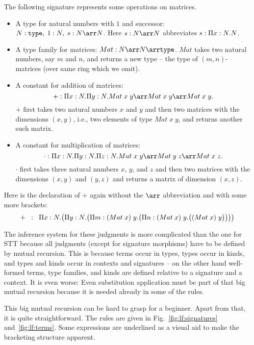 \begin{example}
The following signature represents some operations on matrices.
\begin{itemize}
	\item A type for natural numbers with $1$ and successor: $N:\TYPE,\;1:N,\;s:N\arr N$. Here $s:N\arr N$ abbreviates $s:\P{x}{N}N$.
	\item A type family for matrices: $Mat:N\arr N\arr\TYPE$. $Mat$ takes two natural numbers, say $m$ and $n$, and returns a new type -- the type of $(m,n)$-matrices (over same ring which we omit).
	\item A constant for addition of matrices:
	 \[+:\P{x}{N}\P{y}{N}Mat\;x\;y\arr Mat\;x\;y\arr Mat\;x\;y.\]
	 $+$ first takes two natural numbers $x$ and $y$ and then two matrices with the dimensions $(x,y)$, i.e., two elements of type $Mat\;x\;y$, and returns another such matrix.
	\item A constant for multiplication of matrices: 
	\[\cdot:\P{x}{N}\P{y}{N}\P{z}{N}Mat\;x\;y\arr Mat\;y\;z\arr Mat\;x\;z.\]
	 $\cdot$ first takes three natural numbers $x$, $y$, and $z$ and then two matrices with the dimensions $(x,y)$ and $(y,z)$ and returns a matrix of dimension $(x,z)$.
\end{itemize}
Here is the declaration of $+$ again without the $\arr$ abbreviation and with some more brackets:
\[+\;\;:\;\;\P{x}{N}\big(\P{y}{N}\big(\P{m}{(Mat\;x)\;y}\big(\P{n}{(Mat\;x)\;y}\big((Mat\;x)\;y\big)\big)\big)\big)\]
\end{example}

The inference system for these judgments is more complicated than the one for STT because all judgments (except for signature morphisms) have to be defined by mutual recursion. This is because terms occur in types, types occur in kinds, and types and kinds occur in contexts and signatures -- on the other hand well-formed terms, type families, and kinds are defined relative to a signature and a context. It is even worse: Even substitution application must be part of that big mutual recursion because it is needed already in some of the rules.

This big mutual recursion can be hard to grasp for a beginner. Apart from that, it is quite straightforward. The rules are given in Fig.~\ref{fig:lf:signatures} and~\ref{fig:lf:terms}. Some expressions are underlined as a visual aid to make the bracketing structure apparent.

